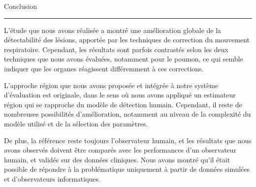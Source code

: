 

{\fontsize{30}{100}\selectfont Conclusion}


\rule{15cm}{0.1em}

\vspace{1cm}

\thispagestyle{plain}

L'étude que nous avons réalisée a montré une amélioration globale de la
détectabilité des lésions, apportée par les techniques de correction du
mouvement respiratoire. Cependant, les résultats sont parfois contrastés
selon les deux techniques que nous avons évaluées, notamment
pour le poumon, ce qui semble indiquer que les organes réagissent différemment à
ces corrections.

L'approche région que nous avons proposée et intégrée à notre système d'évaluation est
originale, dans le sens où nous avons appliqué un estimateur région qui se
rapproche du modèle de détection humain. Cependant, il reste de nombreuses
possibilités d'amélioration, notamment au niveau de la complexité du modèle
utilisé et de la sélection des paramètres. 

De plus, la référence reste toujours l'observateur humain, et les résultats que
nous avons observés doivent être comparés avec les performances d'un observateur
humain, et validés sur des données cliniques. Nous avons montré qu'il était
possible de répondre à la problématique uniquement à partir de données simulées
et d'observateurs informatiques.